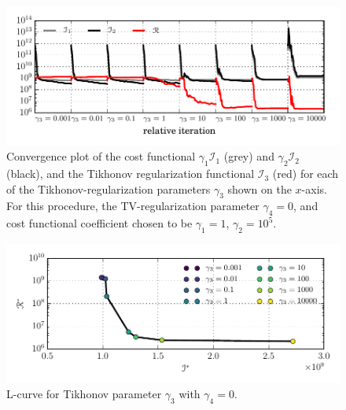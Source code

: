 \begin{figure}
  \centering
    \includegraphics[width=\linewidth]{images/data_assimilation/l_curve/Tikhonov_convergence.pdf}
    \caption[Tikhonov-regularized inverse ISMIP-HOM convergence diagram]{Convergence plot of the cost functional $\gamma_1 \mathscr{I}_1$ (grey) and $\gamma_2 \mathscr{I}_2$ (black), and the Tikhonov regularization functional $\mathscr{I}_3$ (red) for each of the Tikhonov-regularization parameters $\gamma_3$ shown on the $x$-axis.  For this procedure, the TV-regularization parameter $\gamma_4 = 0$, and cost functional coefficient chosen to be $\gamma_1 =1$, $\gamma_2 = 10^5$.}
  \label{ismip_l_curve_convergence_tik}
\end{figure}

\begin{figure}
  \centering
    \includegraphics[width=\linewidth]{images/data_assimilation/l_curve/Tikhonov_l_curve.pdf}
    \caption[ISMIP-HOM Tikhonov L-curve diagram]{L-curve for Tikhonov parameter $\gamma_3$ with $\gamma_4=0$.}
  \label{ismip_l_curve_tik}
\end{figure}

